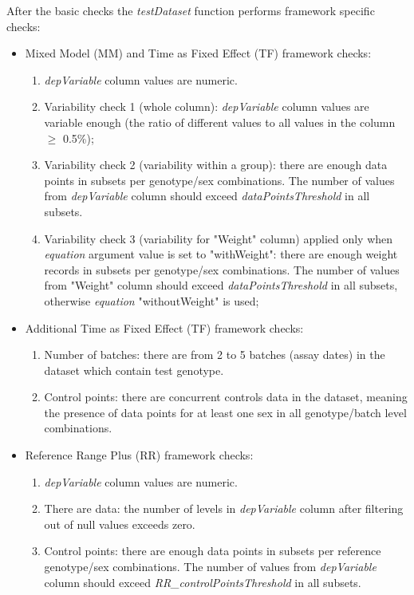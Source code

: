 \documentclass[12pt,a4paper]{article}
\begin{document}
After the basic checks the \textit{testDataset} function performs framework specific checks:
\begin{itemize}
\item Mixed Model (MM) and Time as Fixed Effect (TF) framework checks:
\begin{enumerate}
\item \textit{depVariable} column values are numeric.
\item Variability check 1  (whole column): \textit{depVariable} column values are variable enough (the ratio of different values to all values in the column $\geq$ 0.5\%);
\item Variability check 2 (variability within a group): there are enough data points in subsets per genotype/sex combinations. The number of values from \textit{depVariable} column should exceed \textit{dataPointsThreshold} in all subsets.
\item Variability check 3 (variability for "Weight" column) applied only when \textit{equation} argument value is set to "withWeight": there are enough weight records in subsets per genotype/sex combinations. The number of values from "Weight" column should exceed \textit{dataPointsThreshold} in all subsets, otherwise \textit{equation} "withoutWeight" is used;
\end{enumerate}
\item Additional Time as Fixed Effect (TF) framework checks:
\begin{enumerate}
\item Number of batches: there are from 2 to 5 batches (assay dates) in the dataset which contain test genotype.
\item Control points: there are concurrent controls data in the dataset, meaning the presence of data points for at least one sex in all genotype/batch level combinations.
\end{enumerate}
\item Reference Range Plus (RR) framework checks:
\begin{enumerate}
\item \textit{depVariable} column values are numeric.
\item There are data: the number of levels in \textit{depVariable} column after filtering out of null values exceeds zero. 
\item Control points: there are enough data points in subsets per reference genotype/sex combinations. The number of values from \textit{depVariable} column should exceed \textit{RR\_controlPointsThreshold} in all subsets. 

\end{enumerate}
\end{itemize}
\end{document}
